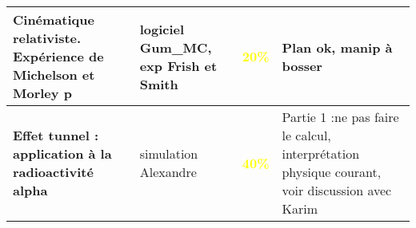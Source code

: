 \begin{changemargin}{-1.5cm}{-0cm}
\begin{center}
\begin{tabularx}{\paperwidth-2cm}{| X | X | c | X |}
  \hline
  \hline
  \textbf{Cinématique relativiste. Expérience de Michelson et Morley} p\pageref{LP_CinematiqueRelativiste} & logiciel Gum\_MC, exp Frish et Smith & \textcolor{yellow}{\textbf{20\%}} & Plan ok, manip à bosser  \\
  \hline
  \textbf{Effet tunnel : application à la radioactivité alpha} & simulation Alexandre & \textcolor{yellow}{\textbf{40\%}} & Partie 1 :ne pas faire le calcul, interprétation physique courant, voir discussion avec Karim  \\
  \hline
\end{tabularx}
\end{center}

\end{changemargin}